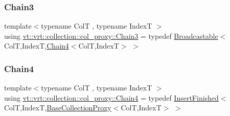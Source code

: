\subsubsection{\texorpdfstring{Chain3}{Chain3}}
{\footnotesize\ttfamily template$<$typename ColT , typename IndexT $>$ \\
using \hyperlink{namespacevt_1_1vrt_1_1collection_1_1col__proxy_aa83ea97afbf21f975d02b933af0ee42c}{vt\+::vrt\+::collection\+::col\+\_\+proxy\+::\+Chain3} = typedef \hyperlink{structvt_1_1vrt_1_1collection_1_1_broadcastable}{Broadcastable}$<$ColT,IndexT,\hyperlink{namespacevt_1_1vrt_1_1collection_1_1col__proxy_a5d45d2ec968c43d468668d6badb2b61e}{Chain4}$<$ColT,IndexT$>$ $>$}

\mbox{\label{namespacevt_1_1vrt_1_1collection_1_1col__proxy_a5d45d2ec968c43d468668d6badb2b61e}} 
\subsubsection{\texorpdfstring{Chain4}{Chain4}}
{\footnotesize\ttfamily template$<$typename ColT , typename IndexT $>$ \\
using \hyperlink{namespacevt_1_1vrt_1_1collection_1_1col__proxy_a5d45d2ec968c43d468668d6badb2b61e}{vt\+::vrt\+::collection\+::col\+\_\+proxy\+::\+Chain4} = typedef \hyperlink{structvt_1_1vrt_1_1collection_1_1_insert_finished}{Insert\+Finished}$<$ColT,IndexT,\hyperlink{structvt_1_1vrt_1_1collection_1_1_base_collection_proxy}{Base\+Collection\+Proxy}$<$ColT,IndexT$>$ $>$}

